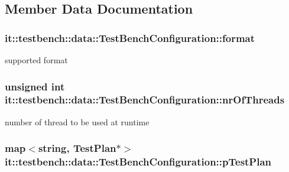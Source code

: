 \subsection{Member Data Documentation}
\hypertarget{classit_1_1testbench_1_1data_1_1TestBenchConfiguration_abaced1b870ac640b02227c6ffcc6ddcd}{
\subsubsection[{format}]{ it\-::testbench\-::data\-::\-Test\-Bench\-Configuration\-::format\hspace{0.3cm}{\ttfamily [private]}}}\label{d5/daa/classit_1_1testbench_1_1data_1_1TestBenchConfiguration_abaced1b870ac640b02227c6ffcc6ddcd}
supported format \hypertarget{classit_1_1testbench_1_1data_1_1TestBenchConfiguration_afe806efbb1076104b8f5f6e5fdf69d2d}{
\subsubsection[{nr\-Of\-Threads}]{\setlength{\rightskip}{0pt plus 5cm}unsigned int it\-::testbench\-::data\-::\-Test\-Bench\-Configuration\-::nr\-Of\-Threads\hspace{0.3cm}{\ttfamily [private]}}}\label{d5/daa/classit_1_1testbench_1_1data_1_1TestBenchConfiguration_afe806efbb1076104b8f5f6e5fdf69d2d}
number of thread to be used at runtime \hypertarget{classit_1_1testbench_1_1data_1_1TestBenchConfiguration_af7bbd2effac8a1e67cbdffea28e21201}{
\subsubsection[{p\-Test\-Plan}]{\setlength{\rightskip}{0pt plus 5cm}map$<$string, {\bf Test\-Plan}$\ast$$>$ it\-::testbench\-::data\-::\-Test\-Bench\-Configuration\-::p\-Test\-Plan\hspace{0.3cm}{\ttfamily [private]}}}\label{d5/daa/classit_1_1testbench_1_1data_1_1TestBenchConfiguration_af7bbd2effac8a1e67cbdffea28e21201}
